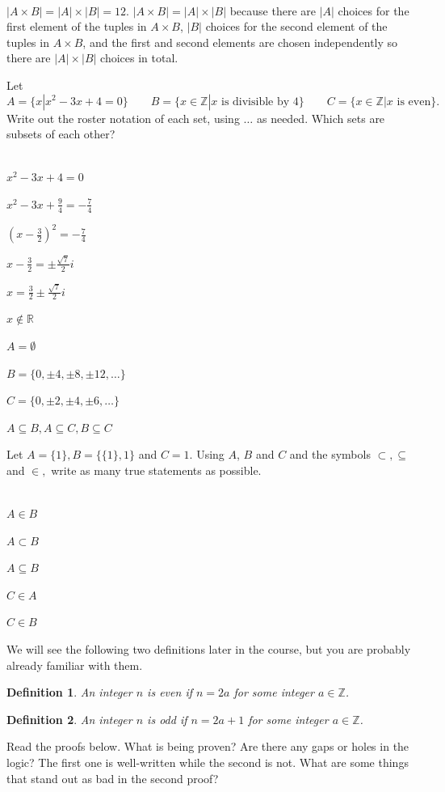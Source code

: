 \documentclass[12 pt]{exam}
\newtheorem{definition}{Definition}
\begin{document}
\begin{questions}
\begin{solution} \\
$|A \times B| = |A| \times |B| = 12$. $|A \times B| = |A| \times |B|$ because there are $|A|$ choices for the first element of the tuples in $A \times B$, $|B|$ choices for the second element of the tuples in $A \times B$, and the first and second elements are chosen independently so there are $|A| \times |B|$ choices in total.
\end{solution}

\question Let $$A=\{x | x^2-3x+4=0\} \qquad B=\{x \in\mathbb{Z} | x \textrm{ is divisible by 4} \} \qquad C=\{x \in \mathbb{Z} | x \textrm{ is even}\}.$$  Write out the roster notation of each set, using $\dots$ as needed. Which sets are subsets of each other?

\begin{solution} \\
$x^2-3x+4 = 0$

$x^2-3x+\frac{9}{4} = -\frac{7}{4}$

$(x-\frac{3}{2})^2 = -\frac{7}{4}$

$x-\frac{3}{2} = \pm \frac{\sqrt{7}}{2} i$

$x = \frac{3}{2} \pm \frac{\sqrt{7}}{2} i$

$x \notin \mathbb{R}$

$A = \emptyset$

$B = \{0, \pm 4, \pm 8, \pm 12, \dots\}$

$C = \{0, \pm 2, \pm 4, \pm 6, \dots\}$

$A \subseteq B, A \subseteq C, B \subseteq C$
\end{solution}


\question Let $A=\{1\}, B=\{\{1\},1\}$ and $C=1.$  Using $A$, $B$ and $C$ and the symbols $\subset, \subseteq$ and $\in,$ write as many true statements as possible.

\begin{solution} \\
$A \in B$

$A \subset B$

$A \subseteq B$

$C \in A$

$C \in B$
    \end{solution}

\question We will see the following two definitions later in the course, but you are probably already familiar with them.
\begin{definition} An integer $n$ is \emph{even} if $n=2a$ for some integer $a \in \mathbb{Z}$. \end{definition}
\begin{definition} An integer $n$ is \emph{odd} if $n=2a+1$ for some integer $a \in \mathbb{Z}$. \end{definition}
Read the proofs below. What is being proven? Are there any gaps or holes in the logic?  The first one is well-written while the second is not. What are some things that stand out as bad in the second proof?


\end{questions}
\end{document}
